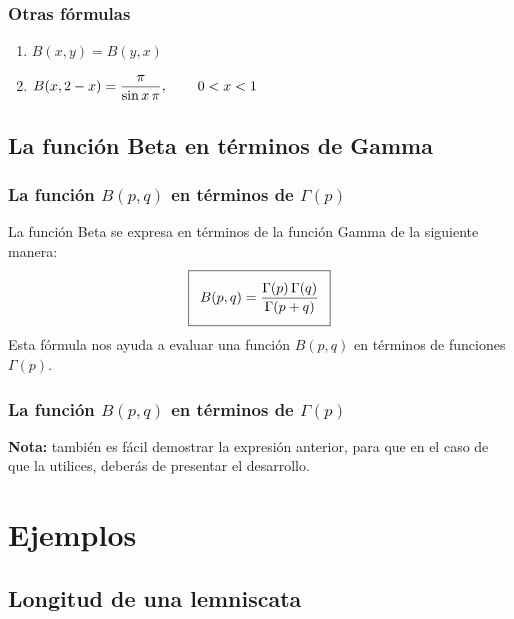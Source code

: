 \documentclass[12pt]{beamer}
\begin{document}
\begin{frame}
\frametitle{Otras fórmulas}
\begin{enumerate}[<+->]
  \setlength{\itemsep}{1em}
  \item $B (x, y) = B (y, x)$ %
  \item $B (x, 2 - x) = \dfrac{\pi}{\sin x \, \pi}, \hspace{0.75cm} 0 < x < 1$
\end{enumerate}
\end{frame}

\subsection{La función Beta en términos de Gamma}

\begin{frame}
\frametitle{La función $B(p, q)$ en términos de $\Gamma (p)$}
La función Beta se expresa en términos de la función Gamma de la siguiente manera:
\begin{align}
\addtolength{\fboxsep}{5pt}\boxed{B(p, q) = \dfrac{\Gamma(p) \, \Gamma(q)}{\Gamma (p + q)}}
\label{eq:ecuacion_07_01}
\end{align}
Esta fórmula nos ayuda a evaluar una función $B (p, q)$ en términos de funciones $\Gamma (p)$.
\end{frame}
\begin{frame}
\frametitle{La función $B(p, q)$ en términos de $\Gamma (p)$}
\textbf{Nota: } también es fácil demostrar la expresión anterior, para que en el caso de que la utilices, deberás de presentar el desarrollo.
\end{frame}

\section{Ejemplos}
\subsection{Longitud de una lemniscata}
\end{document}
